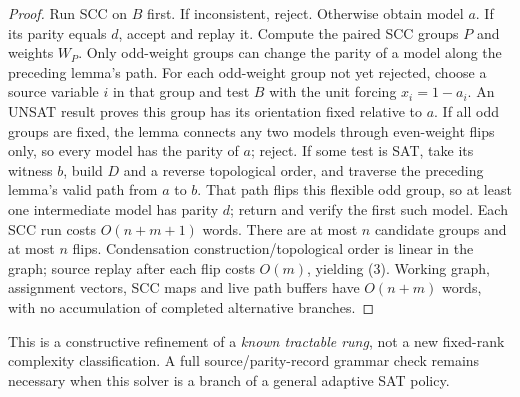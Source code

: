 \documentclass[11pt]{article}
\begin{document}
\begin{proof}
Run SCC on $B$ first. If inconsistent, reject. Otherwise obtain model $a$. If its parity equals $d$, accept and replay it. Compute the paired SCC groups $P$ and weights $W_P$. Only odd-weight groups can change the parity of a model along the preceding lemma's path. For each odd-weight group not yet rejected, choose a source variable $i$ in that group and test $B$ with the unit forcing $x_i=1-a_i$. An UNSAT result proves this group has its orientation fixed relative to $a$. If all odd groups are fixed, the lemma connects any two models through even-weight flips only, so every model has the parity of $a$; reject. If some test is SAT, take its witness $b$, build $D$ and a reverse topological order, and traverse the preceding lemma's valid path from $a$ to $b$. That path flips this flexible odd group, so at least one intermediate model has parity $d$; return and verify the first such model. Each SCC run costs $O(n+m+1)$ words. There are at most $n$ candidate groups and at most $n$ flips. Condensation construction/topological order is linear in the graph; source replay after each flip costs $O(m)$, yielding (3). Working graph, assignment vectors, SCC maps and live path buffers have $O(n+m)$ words, with no accumulation of completed alternative branches.
\end{proof}

This is a constructive refinement of a \emph{known tractable rung}, not a new fixed-rank complexity classification. A full source/parity-record grammar check remains necessary when this solver is a branch of a general adaptive SAT policy.
\end{document}

